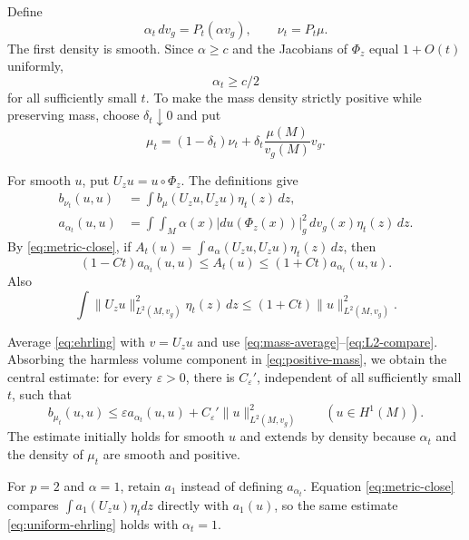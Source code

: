 \documentclass[11pt]{article}
\newcommand{\dv}{\,dv_g}
\newcommand{\Ltwo}{L^2(M,v_g)}
\begin{document}
Define
\[
 \alpha_t\,dv_g=P_t(\alpha v_g),\qquad \nu_t=P_t\mu.
\]
The first density is smooth.  Since \(\alpha\geq c\) and the Jacobians of
\(\Phi_z\) equal \(1+O(t)\) uniformly,
\begin{equation}\label{eq:lower}
 \alpha_t\geq c/2
\end{equation}
for all sufficiently small \(t\).  To make the mass density strictly positive
while preserving mass, choose \(\delta_t\downarrow0\) and put
\begin{equation}\label{eq:positive-mass}
 \mu_t=(1-\delta_t)\nu_t+
 \delta_t\frac{\mu(M)}{v_g(M)}v_g.
\end{equation}

For smooth \(u\), put \(U_zu=u\circ\Phi_z\).  The definitions give
\begin{align}
 b_{\nu_t}(u,u)&=\int\!b_\mu(U_zu,U_zu)\eta_t(z)\,dz,
 \label{eq:mass-average}\\
 a_{\alpha_t}(u,u)&=\int\!\int_M
   \alpha(x)|du(\Phi_z(x))|_g^2\dv(x)\eta_t(z)\,dz.
 \label{eq:energy-scalar}
\end{align}
By \eqref{eq:metric-close}, if
\(A_t(u)=\int a_\alpha(U_zu,U_zu)\eta_t(z)\,dz\), then
\begin{equation}\label{eq:energy-compare}
 (1-Ct)a_{\alpha_t}(u,u)\leq A_t(u)
 \leq(1+Ct)a_{\alpha_t}(u,u).
\end{equation}
Also
\begin{equation}\label{eq:L2-compare}
 \int\|U_zu\|_{\Ltwo}^2\eta_t(z)\,dz
 \leq(1+Ct)\|u\|_{\Ltwo}^2.
\end{equation}

Average \eqref{eq:ehrling} with \(v=U_zu\) and use
\eqref{eq:mass-average}--\eqref{eq:L2-compare}.  Absorbing the harmless
volume component in \eqref{eq:positive-mass}, we obtain the central estimate:
for every \(\varepsilon>0\), there is \(C_\varepsilon'\), independent of all
sufficiently small \(t\), such that
\begin{equation}\label{eq:uniform-ehrling}
 b_{\mu_t}(u,u)\leq
 \varepsilon a_{\alpha_t}(u,u)
 +C_\varepsilon'\|u\|_{\Ltwo}^2
 \qquad(u\in H^1(M)).
\end{equation}
The estimate initially holds for smooth \(u\) and extends by density because
\(\alpha_t\) and the density of \(\mu_t\) are smooth and positive.

For \(p=2\) and \(\alpha=1\), retain \(a_1\) instead of defining
\(a_{\alpha_t}\).  Equation \eqref{eq:metric-close} compares
\(\int a_1(U_zu)\eta_t dz\) directly with \(a_1(u)\), so the same estimate
\eqref{eq:uniform-ehrling} holds with \(\alpha_t=1\).
\end{document}
